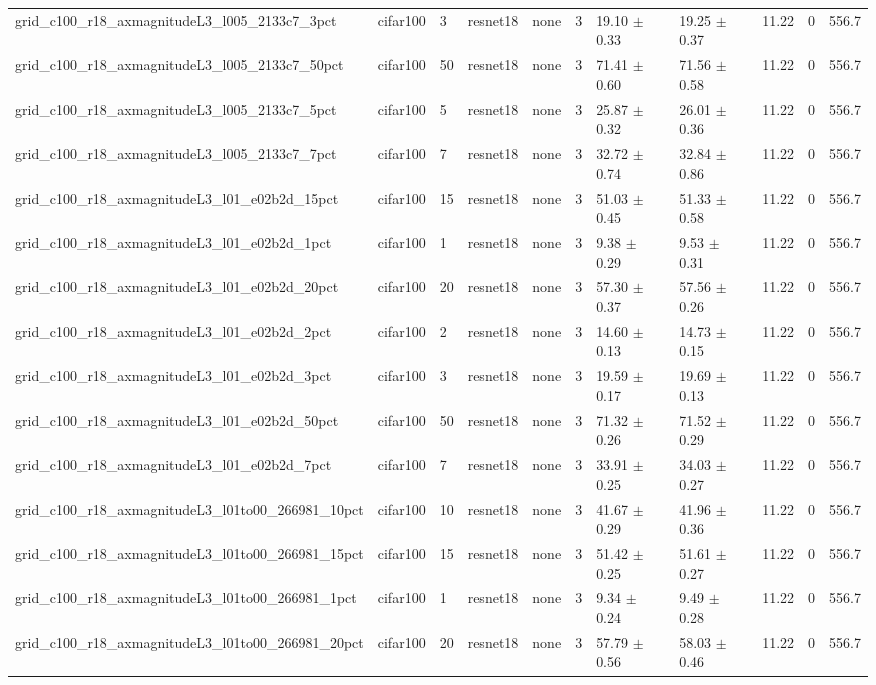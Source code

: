 \begin{tabular}{lllllllllll}
grid_c100_r18_axmagnitudeL3_l005_2133c7_3pct & cifar100 & 3 & resnet18 & none & 3 & 19.10 $\pm$ 0.33 & 19.25 $\pm$ 0.37 & 11.22 & 0 & 556.7 \\
grid_c100_r18_axmagnitudeL3_l005_2133c7_50pct & cifar100 & 50 & resnet18 & none & 3 & 71.41 $\pm$ 0.60 & 71.56 $\pm$ 0.58 & 11.22 & 0 & 556.7 \\
grid_c100_r18_axmagnitudeL3_l005_2133c7_5pct & cifar100 & 5 & resnet18 & none & 3 & 25.87 $\pm$ 0.32 & 26.01 $\pm$ 0.36 & 11.22 & 0 & 556.7 \\
grid_c100_r18_axmagnitudeL3_l005_2133c7_7pct & cifar100 & 7 & resnet18 & none & 3 & 32.72 $\pm$ 0.74 & 32.84 $\pm$ 0.86 & 11.22 & 0 & 556.7 \\
grid_c100_r18_axmagnitudeL3_l01_e02b2d_15pct & cifar100 & 15 & resnet18 & none & 3 & 51.03 $\pm$ 0.45 & 51.33 $\pm$ 0.58 & 11.22 & 0 & 556.7 \\
grid_c100_r18_axmagnitudeL3_l01_e02b2d_1pct & cifar100 & 1 & resnet18 & none & 3 & 9.38 $\pm$ 0.29 & 9.53 $\pm$ 0.31 & 11.22 & 0 & 556.7 \\
grid_c100_r18_axmagnitudeL3_l01_e02b2d_20pct & cifar100 & 20 & resnet18 & none & 3 & 57.30 $\pm$ 0.37 & 57.56 $\pm$ 0.26 & 11.22 & 0 & 556.7 \\
grid_c100_r18_axmagnitudeL3_l01_e02b2d_2pct & cifar100 & 2 & resnet18 & none & 3 & 14.60 $\pm$ 0.13 & 14.73 $\pm$ 0.15 & 11.22 & 0 & 556.7 \\
grid_c100_r18_axmagnitudeL3_l01_e02b2d_3pct & cifar100 & 3 & resnet18 & none & 3 & 19.59 $\pm$ 0.17 & 19.69 $\pm$ 0.13 & 11.22 & 0 & 556.7 \\
grid_c100_r18_axmagnitudeL3_l01_e02b2d_50pct & cifar100 & 50 & resnet18 & none & 3 & 71.32 $\pm$ 0.26 & 71.52 $\pm$ 0.29 & 11.22 & 0 & 556.7 \\
grid_c100_r18_axmagnitudeL3_l01_e02b2d_7pct & cifar100 & 7 & resnet18 & none & 3 & 33.91 $\pm$ 0.25 & 34.03 $\pm$ 0.27 & 11.22 & 0 & 556.7 \\
grid_c100_r18_axmagnitudeL3_l01to00_266981_10pct & cifar100 & 10 & resnet18 & none & 3 & 41.67 $\pm$ 0.29 & 41.96 $\pm$ 0.36 & 11.22 & 0 & 556.7 \\
grid_c100_r18_axmagnitudeL3_l01to00_266981_15pct & cifar100 & 15 & resnet18 & none & 3 & 51.42 $\pm$ 0.25 & 51.61 $\pm$ 0.27 & 11.22 & 0 & 556.7 \\
grid_c100_r18_axmagnitudeL3_l01to00_266981_1pct & cifar100 & 1 & resnet18 & none & 3 & 9.34 $\pm$ 0.24 & 9.49 $\pm$ 0.28 & 11.22 & 0 & 556.7 \\
grid_c100_r18_axmagnitudeL3_l01to00_266981_20pct & cifar100 & 20 & resnet18 & none & 3 & 57.79 $\pm$ 0.56 & 58.03 $\pm$ 0.46 & 11.22 & 0 & 556.7 \\

\end{tabular}
